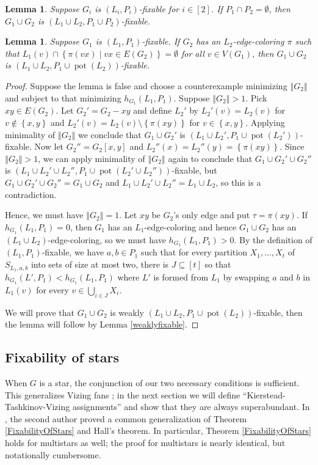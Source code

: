 \documentclass[12pt]{article}
\theoremstyle{plain}
\newtheorem{lem}[thm]{Lemma}
\theoremstyle{definition}
\theoremstyle{remark}
\newcommand{\set}[1]{\left\{ #1 \right\}}
\newcommand{\setbs}[2]{\left\{ #1 \mid #2 \right\}}
\newcommand{\size}[1]{\left\Vert#1\right\Vert}
\newcommand{\irange}[1]{\left[#1\right]}
\newcommand{\pot}{\operatorname{pot}}
\begin{document}
\begin{lem}
Suppose $G_i$ is $(L_i, P_i)$-fixable for $i \in \irange{2}$.  If $P_1 \cap P_2 = \emptyset$, then $G_1 \cup G_2$ is $(L_1 \cup L_2, P_1 \cup P_2)$-fixable.
\end{lem}
\begin{lem}
Suppose $G_1$ is $(L_1, P_1)$-fixable.  If $G_2$ has an $L_2$-edge-coloring $\pi$ such that $L_1(v) \cap \setbs{\pi(vx)}{vx \in E(G_2)} = \emptyset$ for all $v \in V(G_1)$, then $G_1 \cup G_2$ is $(L_1 \cup L_2, P_1 \cup \pot(L_2))$-fixable.
\end{lem}
\begin{proof}
Suppose the lemma is false and choose a counterexample minimizing $\size{G_2}$ and subject to that minimizing $h_{G_1}(L_1, P_1)$.  Suppose $\size{G_2} > 1$. Pick $xy \in E(G_2)$.  Let $G_2' = G_2 - xy$ and define $L_2'$ by $L_2'(v) = L_2(v)$ for $v \not \in \set{x,y}$ and $L_2'(v) = L_2(v) \setminus \set{\pi(xy)}$ for $v \in \set{x,y}$.  Applying minimality of $\size{G_2}$ we conclude that $G_1 \cup G_2'$ is $(L_1 \cup L_2', P_1 \cup \pot(L_2'))$-fixable.  Now let $G_2'' = G_2[x,y]$ and $L_2''(x) = L_2''(y) = \set{\pi(xy)}$.  Since $\size{G_2} > 1$, we can apply minimality of $\size{G_2}$ again to conclude that $G_1 \cup G_2' \cup G_2''$ is $(L_1 \cup L_2' \cup L_2'', P_1 \cup \pot(L_2' \cup L_2''))$-fixable, but $G_1 \cup G_2' \cup G_2'' = G_1 \cup G_2$ and $L_1 \cup L_2' \cup L_2'' = L_1 \cup L_2$, so this is a contradiction.

Hence, we must have $\size{G_2} = 1$. Let $xy$ be $G_2$'s only edge and put $\tau = \pi(xy)$. If $h_{G_1}(L_1, P_1) = 0$, then $G_1$ has an $L_1$-edge-coloring and hence $G_1 \cup G_2$ has an $(L_1 \cup L_2)$-edge-coloring, so we must have $h_{G_1}(L_1, P_1) > 0$.  By the definition of $(L_1, P_1)$-fixable, we have $a,b \in P_1$ such that for every partition $X_1, \ldots, X_t$ of $S_{L_1,a,b}$ into sets of size at most two, 
there is $J \subseteq \irange{t}$ so that $h_{G_1}(L', P_1) < h_{G_1}(L_1, P_1)$ where $L'$ is formed from $L_1$ by swapping $a$ and $b$ in $L_1(v)$ for every $v \in \bigcup_{i \in J} X_i$.

We will prove that $G_1 \cup G_2$ is weakly $(L_1 \cup L_2, P_1 \cup \pot(L_2))$-fixable, then the lemma will follow by Lemma \ref{weaklyfixable}.
\end{proof}

\subsection{Fixability of stars}
When $G$ is a star, the conjunction of our two necessary conditions is sufficient. This generalizes Vizing fans \cite{Vizing76}; in the next section we will define ``Kierstead-Tashkinov-Vizing assignments'' and show that they are always superabundant.  In \cite{HallGame}, the second author proved a common generalization of Theorem \ref{FixabilityOfStars} and Hall's theorem.  In particular, Theorem \ref{FixabilityOfStars} holds for multistars as well; the proof for multistars is nearly identical, but notationally cumbersome.
\end{document}

